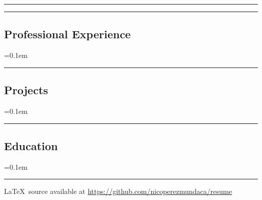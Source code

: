 





\hrule
\begin{indentsection}{\parindent}
\begin{description*}
  
  
\end{description*}
\end{indentsection}

\hrule
\vspace{-0.4em}
\subsection*{Professional Experience}
\begin{itemize}
  \parskip=0.1em
  
  
  
\end{itemize}

\hrule
\vspace{-0.4em}
\subsection*{Projects}
\begin{itemize}
  \parskip=0.1em
  
  
  
  
  
  
\end{itemize}


\hrule
\vspace{-0.4em}
\subsection*{Education}
\begin{itemize}
  \parskip=0.1em

  
\end{itemize}
\hrule


%  

\begin{center}
\footnotesize \LaTeX \ source available at
\url{https://github.com/nicoperezmundaca/resume}
\end{center}


